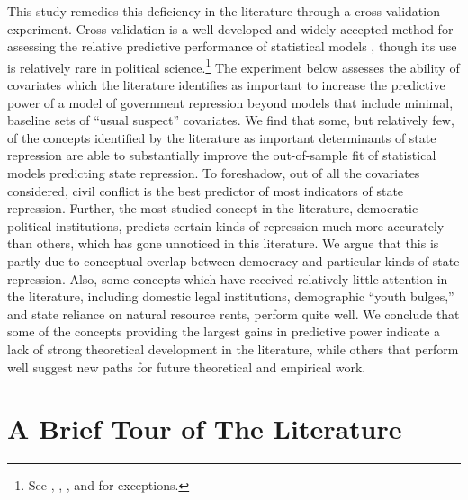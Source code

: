 \documentclass[12pt]{article}
\begin{document}
This study remedies this deficiency in the literature through a cross-validation experiment. Cross-validation is a well developed and widely accepted method for assessing the relative predictive performance of statistical models \citep[See, e.g.,][]{Geisser1975, Efron1983, PicardCook1984, HastieTibshiraniFriedman2008}, though its use is relatively rare in political science.\footnote{See \citet{HoffWard2004}, \citet{WardHoff2007}, \citet{WardSiversonCao2007}, and \citet{Wardetal2010} for exceptions.} The experiment below assesses the ability of covariates which the literature identifies as important to increase the predictive power of a model of government repression beyond models that include minimal, baseline sets of ``usual suspect'' covariates. We find that some, but relatively few, of the concepts identified by the literature as important determinants of state repression are able to substantially improve the out-of-sample fit of statistical models predicting state repression. To foreshadow, out of all the covariates considered, civil conflict is the best predictor of most indicators of state repression. Further, the most studied concept in the literature, democratic political institutions, predicts certain kinds of repression much more accurately than others, which has gone unnoticed in this literature. We argue that this is partly due to conceptual overlap between democracy and particular kinds of state repression. Also, some concepts which have received relatively little attention in the literature, including domestic legal institutions, demographic ``youth bulges,'' and state reliance on natural resource rents, perform quite well. We conclude that some of the concepts providing the largest gains in predictive power indicate a lack of strong theoretical development in the literature, while others that perform well suggest new paths for future theoretical and empirical work. 

\section{A Brief Tour of The Literature}
\end{document}
